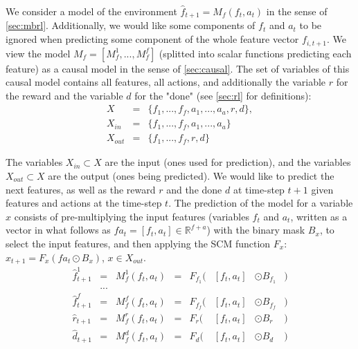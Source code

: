 \documentclass[a4paper,11pt,oneside]{report}
\begin{document}
We consider a model of the environment $\hat{f}_{t+1}=M_f(f_t,a_t)$ in the sense of \autoref{sec:mbrl}. Additionally, we would like some components of $f_t$ and $a_t$ to be ignored when predicting some component of the whole feature vector $f_{i,t+1}$. We view the model $M_f=[M_f^1,...,M_f^f]$ (splitted into scalar functions predicting each feature) as a causal model in the sense of \autoref{sec:causal}. The set of variables of this causal model contains all features, all actions, and additionally the variable $r$ for the reward and the variable $d$ for the "done" (see \autoref{sec:rl} for definitions):
$$
\begin{array}{lcl}
X&=&\{f_1,...,f_f,a_1,...,a_a,r,d\},\\
X_{in}&=&\{f_1,...,f_f,a_1,...,a_a\}\\
X_{out}&=&\{f_1,...,f_f,r,d\}
\end{array}
$$

The variables $X_{in}\subset X$ are the input (ones used for prediction), and the variables $X_{out}\subset X$ are the output (ones being predicted).
We would like to predict the next features, as well as the reward $r$ and the done $d$ at time-step $t+1$ given features and actions at the time-step $t$. The prediction of the model for a variable $x$ consists of pre-multiplying the input features (variables $f_t$ and $a_t$, written as a vector in what follows as $fa_t=[f_t,a_t]\in\mathbb R^{f+a}$) with the binary mask $B_x$, to select the input features, and then applying the SCM function $F_x$: $x_{t+1}=F_x(fa_t\odot B_x)$, $x\in X_{out}$.
$$
\begin{array}{lcllrllr}
\hat{f}_{t+1}^1&=&M_f^1(f_t,a_t)&=&F_{f_1}(&[f_t,a_t]&\odot B_{f_1}&)\\
&...&\\
\hat{f}_{t+1}^f&=&M_f^f(f_t,a_t)&=&F_{f_f}(&[f_t,a_t]&\odot B_{f_f}&)\\
\hat{r}_{t+1}&=&M_f^r(f_t,a_t)&=&F_{r}(&[f_t,a_t]&\odot B_{r}&)\\
\hat{d}_{t+1}&=&M_f^d(f_t,a_t)&=&F_{d}(&[f_t,a_t]&\odot B_{d}&)\\
\end{array}
$$
\end{document}

